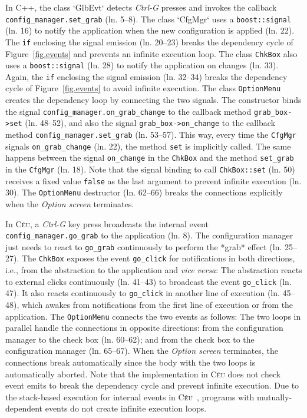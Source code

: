 \documentclass{vgtc}                          %
\newcommand{\CEU}{\textsc{C\'{e}u}\xspace}
\newcommand{\code}[1] {{\small{\texttt{#1}}}}
\begin{document}
In C++, the class `GlbEvt` detects \emph{Ctrl-G} presses and invokes the
callback \code{config\_manager.set\_grab} (ln. 5--8).
%
The class `CfgMgr` uses a \code{boost::signal} (ln. 16) to notify the
application when the new configuration is applied (ln. 22).
%
The \code{if} enclosing the signal emission (ln. 20--23) breaks the dependency 
cycle of Figure~\ref{fig.events} and prevents an infinite execution loop.
%
The class \code{ChkBox} also uses a \code{boost::signal} (ln. 28) to notify
the application on changes (ln. 33).
%
Again, the \code{if} enclosing the signal emission (ln. 32--34) breaks the 
dependency cycle of Figure~\ref{fig.events} to avoid infinite execution.
%
The class \code{OptionMenu} creates the dependency loop by connecting the two
signals.
%
The constructor binds
the signal \code{config\_manager.on\_grab\_change} to the callback
    method \code{grab\_box->set} (ln. 48--52),
and also
the signal \code{grab\_box->on\_change} to the callback method
    \code{config\_manager.set\_grab} (ln. 53--57).
This way, every time the \code{CfgMgr} signals
\code{on\_grab\_change} (ln. 22), the method \code{set} is implicitly called.
The same happens between the signal \code{on\_change} in the \code{ChkBox}
and the method \code{set\_grab} in the \code{CfgMgr} (ln. 18).
%
Note that the signal binding to call \code{ChkBox::set} (ln. 50) receives a
fixed value \code{false} as the last argument to prevent infinite execution
(ln. 30).
%
The \code{OptionMenu} destructor (ln. 62--66) breaks the connections explicitly
when the \emph{Option screen} terminates.

In \CEU, a \emph{Ctrl-G} key press broadcasts the internal event
\code{config\_manager.go\_grab} to the application (ln. 8).
%
The configuration manager just needs to react to \code{go\_grab}
continuously to perform the *grab* effect (ln. 25--27).
%
The \code{ChkBox} exposes the event \code{go\_click} for notifications in
both directions, i.e., from the abstraction to the application and
\emph{vice versa}:
%
The abstraction reacts to external clicks continuously (ln. 41--43) to
broadcast the event \code{go\_click} (ln. 47).
It also reacts continuously to \code{go\_click} in another line of execution
(ln. 45--48), which awakes from notifications from the first line of execution
or from the application.
%
The \code{OptionMenu} connects the two events as follows:
%
The two loops in parallel handle the connections in opposite directions:
from the configuration manager to the check box (ln. 60--62);
and
from the check box to the configuration manager (ln. 65--67).
%
When the \emph{Option screen} terminates, the connections break automatically
since the body with the two loops is automatically aborted.
%
Note that the implementation in \CEU does not check event emits to break the
dependency cycle and prevent infinite execution.
Due to the stack-based execution for internal events in
\CEU~\cite{ceu.sensys13)}, programs with mutually-dependent events do not
create infinite execution loops.
\end{document}
